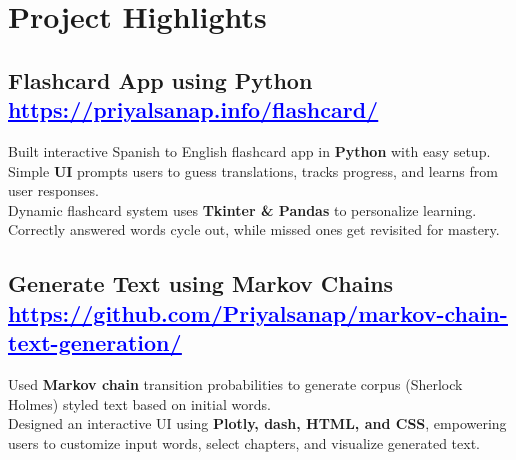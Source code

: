 \documentclass[]{resume}
\begin{document}


\section{Project Highlights}
\hrulefill


\subsection{Flashcard App using Python \small \href{https://priyalsanap.info/flashcard/}{\textcolor{blue}{\underline{https://priyalsanap.info/flashcard/}}}\hfill }

\begin{adjustwidth}{0.5cm}{0cm}
    \pt Built interactive Spanish to English flashcard app in \textbf{Python} with easy setup. Simple \textbf{UI} prompts users to guess translations, tracks progress, and learns from user responses.\\
    \pt Dynamic flashcard system uses \textbf{Tkinter \& Pandas} to personalize learning. Correctly answered words cycle out, while missed ones get revisited for mastery. \\
    \sectionsep
\end{adjustwidth}


\subsection{Generate Text using Markov Chains \small \href{https://github.com/Priyalsanap/markov-chain-text-generation/}{\textcolor{blue}{\underline{https://github.com/Priyalsanap/markov-chain-text-generation/}}}\hfill }


\begin{adjustwidth}{0.5cm}{0cm}
    \pt Used \textbf{Markov chain} transition probabilities to generate corpus (Sherlock Holmes) styled text based on initial words.\\
    \pt Designed an interactive UI using \textbf{Plotly, dash, HTML, and CSS}, empowering users to customize input words, select chapters, and visualize generated text.
    \sectionsep
\end{adjustwidth}
\end{document}
